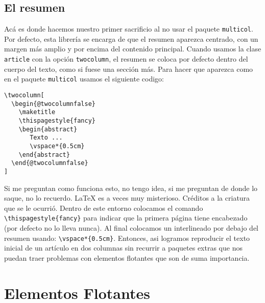 \documentclass[a4paper,10pt,twocolumn,twoside]{article}
\begin{document}
\subsection{El resumen}
Acá es donde hacemos nuestro primer sacrificio al no usar el paquete \texttt{multicol}. Por defecto, esta librería se encarga de que el resumen aparezca centrado, con un margen más amplio y por encima del contenido principal. Cuando usamos la clase \texttt{article} con la opción \texttt{twocolumn}, el resumen se coloca por defecto dentro del cuerpo del texto, como si fuese una sección más. Para hacer que aparezca como en el paquete \texttt{multicol} usamos el siguiente codigo:
\begin{Verbatim}[fontsize=\fontsize{7pt}{7pt}\selectfont]
\twocolumn[
  \begin{@twocolumnfalse}
    \maketitle
    \thispagestyle{fancy}
    \begin{abstract}
       Texto ...
       \vspace*{0.5cm}
    \end{abstract}
  \end{@twocolumnfalse}
]
\end{Verbatim}
Si me preguntan como funciona esto, no tengo idea, si me preguntan de donde lo saque, no lo recuerdo. \LaTeX{} es a veces muy misterioso. Créditos a la criatura que se le ocurrió. Dentro de este entorno colocamos el comando \verb+\thispagestyle{fancy}+ para indicar que la primera página tiene encabezado (por defecto no lo lleva nunca). Al final colocamos un interlineado por debajo del resumen usando: \verb+\vspace*{0.5cm}+. Entonces, asi logramos reproducir el texto inicial de un artículo en dos columnas sin recurrir a paquetes extras que nos puedan traer problemas con elementos flotantes que son de suma importancia.

\section{Elementos Flotantes}

\begin{table}[t]
    \centering
    \caption{Valores aceptados para la velocidad de la luz y la constante de Boltzmann.}
    \label{tab:tabla_1}
\end{table}
\end{document}
